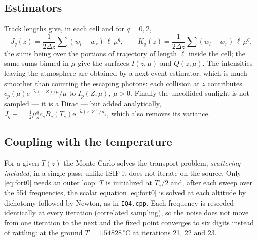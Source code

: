 \documentclass[11pt,a4paper]{article}
\newcommand{\e}{\mathrm{e}}
\newcommand{\skappa}{\tilde\kappa}
\newcommand{\ISIF}{\texttt{IQ4.cpp}}
\begin{document}
\subsection{Estimators}
Track lengths give, in each cell and for $q=0,2$,
\[
J_q(z)=\frac1{2\Delta z}\sum (w_l+w_r)\,\ell\,\mu^q,\qquad
K_q(z)=\frac1{2\Delta z}\sum (w_l-w_r)\,\ell\,\mu^q,
\]
the sums being over the portions of trajectory of length $\ell$ inside the cell; the same
sums binned in $\mu$ give the surfaces $I(z,\mu)$ and $Q(z,\mu)$. The intensities leaving
the atmosphere are obtained by a next event estimator, which is much smoother than
counting the escaping photons: each collision at $z$ contributes
$c_p(\mu)\e^{-\skappa(z,Z)/\mu}/\mu$ to $I_p(Z,\mu)$, $\mu>0$. Finally the uncollided
sunlight is not sampled --- it is a Dirac --- but added analytically,
$J_q\mathrel{+}=\frac12\mu_s^qc_sB_\nu(T_s)\e^{-\skappa(z,Z)/\mu_s}$, which also removes
its variance.

\subsection{Coupling with the temperature}
For a given $T(z)$ the Monte Carlo solves the transport problem, \emph{scattering
included}, in a single pass: unlike ISIF it does not iterate on the source. Only
\eqref{eq:fort0} needs an outer loop: $T$ is initialized at $T_e/2$ and, after each sweep
over the 554 frequencies, the scalar equation \eqref{eq:fort0} is solved at each altitude
by dichotomy followed by Newton, as in \ISIF. Each frequency is reseeded identically at
every iteration (correlated sampling), so the noise does not move from one iteration to
the next and the fixed point converges to six digits instead of rattling: at the ground
$T=1.54828\,^\circ$C at iterations 21, 22 and 23.
\end{document}
